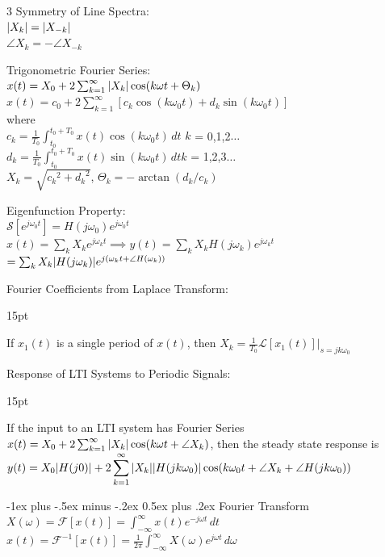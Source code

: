 \documentclass[12pt,landscape,letterpaper]{article}
\makeatletter
\renewcommand{\section}{\@startsection{section}{1}{0mm}%
                                {-1ex plus -.5ex minus -.2ex}%
                                {0.5ex plus .2ex}%
                                {\normalfont\normalsize\bfseries}}
\newcommand{\tab}{\hspace{0.02\textwidth}}
\newcommand{\ds}{\displaystyle}
\newenvironment{tabbed}
{
\vspace{-\parskip}
\begin{adjustwidth}{15pt}{}
}
{\end{adjustwidth}}
\makeatother
\begin{document}
\begin{multicols*}{3}
\columnbreak
Symmetry of Line Spectra:\\
\tab $\abs{X_k} = \abs{X_{-k}}$\\
\tab $\angle X_k = -\angle X_{-k}$

Trigonometric Fourier Series:\\
\tab $x(t) = X_0 + 2\sum_{k = 1}^{\infty}\abs{X_k}\cos(k\omega t + \Theta_k)$\\
\tab $x(t) = c_0 + 2\sum_{k = 1}^{\infty}[c_k\cos(k\omega_0 t) + d_k\sin(k\omega_0 t)]$\\
\tab where\\
\tab $c_k = \frac{1}{T_0} \int_{t_0}^{t_0 + T_0}x(t)\cos(k\omega_0 t)\,dt$ \quad $k$ = 0,1,2$\ldots$\\
\tab $d_k = \frac{1}{T_0} \int_{t_0}^{t_0 + T_0}x(t)\sin(k\omega_0 t)\,dt$\quad $k$ = 1,2,3$\ldots$\\
\tab $X_k = \sqrt{{c_k}^2 + {d_k}^2}$, \quad $\Theta_k = -\arctan(d_k/c_k)$

Eigenfunction Property:\\
\tab $\mathcal{S}[e^{j\omega_0t}] = H(j\omega_0)e^{j\omega_0t}$\\
\tab $x(t) = \sum_k X_k e^{j\omega_kt} \implies y(t) = \sum_k X_k H(j\omega_k)e^{j\omega_kt}$\\\vspace{1mm}\hspace{2.5cm}$= \sum_k X_k \abs{H(j\omega_k)}e^{j(\omega_kt + \angle H(\omega_k))}$

Fourier Coefficients from Laplace Transform:\\
\begin{tabbed}
If $x_1(t)$ is a single period of $x(t)$, then
$X_k = \frac{1}{T_0}\mathcal{L}[x_1(t)] \big\rvert_{s = jk\omega_0}$
\end{tabbed}

Response of LTI Systems to Periodic Signals:\\
\begin{tabbed}
If the input to an LTI system has Fourier Series $x(t) = X_0 + 2\sum_{k=1}^{\infty}\abs{X_k}\cos(k\omega t + \angle X_k)$, then the steady state response is $\ds y(t) = \displaystyle X_0\abs{H(j0)} + 2\sum_{k=1}^{\infty}\abs{X_k}\abs{H(jk\omega_0)}\cos(k\omega_0 t + \angle X_k + \angle H(jk\omega_0))$
\end{tabbed}

\section{Fourier Transform}
\tab $X(\omega) = \mathcal{F}\left[x(t)\right] = \int_{-\infty}^{\infty}x(t)e^{-j\omega t}\,dt$\\
\vspace{5pt}
\tab $x(t) = \mathcal{F}^{-1}\left[x(t)\right] = \frac{1}{2\pi}\int_{-\infty}^{\infty}X(\omega)e^{j\omega t}\,d\omega$


\end{multicols*}
\end{document}
